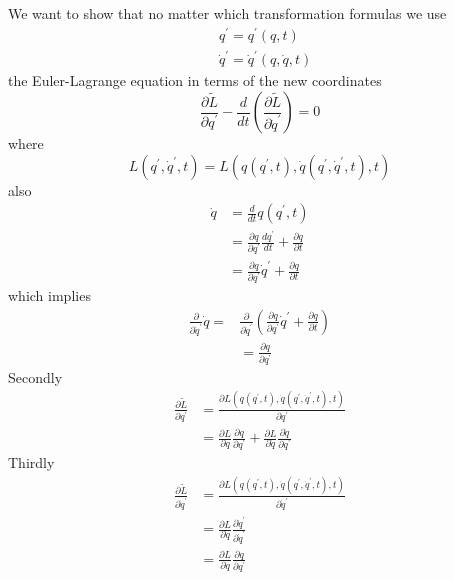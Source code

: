 \begin{mybox2}
We want to show that no matter which transformation formulas we use
$$
\begin{aligned}
&q^{\prime}=q^{\prime}(q, t)\\
&\dot{q}^{\prime}=\dot{q}^{\prime}(q, \dot{q}, t)
\end{aligned}
$$
the Euler-Lagrange equation in terms of the new coordinates
$$
\frac{\partial \tilde{L}}{\partial q^{\prime}}-\frac{d}{d t}\left(\frac{\partial \tilde{L}}{\partial \dot{q}^{\prime}}\right)=0
$$
where
$$
L\left(q^{\prime}, \dot{q}^{\prime}, t\right)=L\left(q\left(q^{\prime}, t\right), \dot{q}\left(q^{\prime}, \dot{q}^{\prime}, t\right), t\right)
$$
also
$$
\begin{aligned}
\dot{q} &=\frac{d}{d t} q\left(q^{\prime}, t\right) \\
&=\frac{\partial q}{\partial q^{\prime}} \frac{d q^{\prime}}{d t}+\frac{\partial q}{\partial t} \\
&=\frac{\partial q}{\partial q^{\prime}} \dot{q}^{\prime}+\frac{\partial q}{\partial t}
\end{aligned}
$$
which implies
$$
\begin{aligned}
\frac{\partial}{\partial \dot{q}^{\prime}} \dot{q}= & \frac{\partial}{\partial \dot{q}^{\prime}}\left(\frac{\partial q}{\partial q^{\prime}} \dot{q}^{\prime}+\frac{\partial q}{\partial t}\right) \\
&=\frac{\partial q}{\partial q^{\prime}}
\end{aligned}
$$
Secondly
$$
\begin{aligned}
\frac{\partial \tilde{L}}{\partial q^{\prime}} &=\frac{\partial L\left(q\left(q^{\prime}, t\right), \dot{q}\left(q^{\prime}, \dot{q}^{\prime}, t\right), t\right)}{\partial q^{\prime}} \\
&=\frac{\partial L}{\partial q} \frac{\partial q}{\partial q^{\prime}}+\frac{\partial L}{\partial \dot{q}} \frac{\partial \dot{q}}{\partial q^{\prime}}
\end{aligned}
$$
Thirdly
$$
\begin{aligned}
\frac{\partial \tilde{L}}{\partial \dot{q}^{\prime}} & = \frac{\partial L\left(q\left(q^{\prime}, t\right), \dot{q}\left(q^{\prime}, \dot{q}^{\prime}, t\right), t\right)}{\partial \dot{q}^{\prime}} \\
&=\frac{\partial L}{\partial \dot{q}} \frac{\partial \dot{q}^{\prime}}{\partial \dot{q}^{\prime}} \\
&=\frac{\partial L}{\partial \dot{q}} \frac{\partial q}{\partial q^{\prime}}
\end{aligned}
$$
\end{mybox2}
